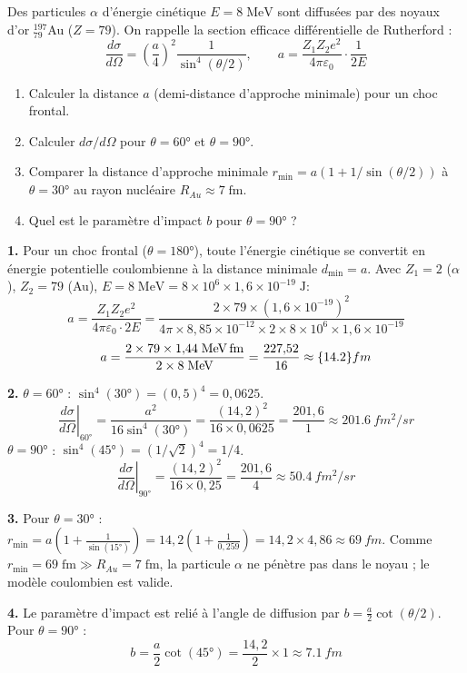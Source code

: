 \documentclass[12pt,a4paper]{article}
\begin{document}
\begin{boiteexercice}
Des particules $\alpha$ d'énergie cinétique $E=8\;\text{MeV}$ sont diffusées par des noyaux d'or ${}^{197}_{79}$Au ($Z=79$). On rappelle la section efficace différentielle de Rutherford :
\[
\frac{d\sigma}{d\Omega} = \left(\frac{a}{4}\right)^2 \frac{1}{\sin^4(\theta/2)}, \qquad a = \frac{Z_1 Z_2 e^2}{4\pi\varepsilon_0}\cdot\frac{1}{2E}
\]
\begin{enumerate}
  \item Calculer la distance $a$ (demi-distance d'approche minimale) pour un choc frontal.
  \item Calculer $d\sigma/d\Omega$ pour $\theta=60°$ et $\theta=90°$.
  \item Comparer la distance d'approche minimale $r_\text{min}=a(1+1/\sin(\theta/2))$ à $\theta=30°$ au rayon nucléaire $R_{Au}\approx 7\;\text{fm}$.
  \item Quel est le paramètre d'impact $b$ pour $\theta=90°$ ?
\end{enumerate}
\end{boiteexercice}

\begin{boitecorrige}
\textbf{1.} Pour un choc frontal ($\theta=180°$), toute l'énergie cinétique se convertit en énergie potentielle coulombienne à la distance minimale $d_\text{min}=a$. Avec $Z_1=2$ ($\alpha$), $Z_2=79$ (Au), $E=8\;\text{MeV}=8\times10^6\times1{,}6\times10^{-19}\;\text{J}$:
\[
a = \frac{Z_1 Z_2 e^2}{4\pi\varepsilon_0\cdot 2E} = \frac{2\times79\times(1{,}6\times10^{-19})^2}{4\pi\times8{,}85\times10^{-12}\times2\times8\times10^6\times1{,}6\times10^{-19}}
\]
\[
a = \frac{2\times79\times1{,}44\;\text{MeV\,fm}}{2\times8\;\text{MeV}} = \frac{227{,}52}{16} \approx \qty{14.2}{fm}
\]

\textbf{2.} $\theta=60°$ : $\sin^4(30°) = (0{,}5)^4 = 0{,}0625$.
\[
\left.\frac{d\sigma}{d\Omega}\right|_{60°} = \frac{a^2}{16\sin^4(30°)} = \frac{(14{,}2)^2}{16\times0{,}0625} = \frac{201{,}6}{1} \approx \qty{201.6}{fm^2/sr}
\]
$\theta=90°$ : $\sin^4(45°) = (1/\sqrt{2})^4 = 1/4$.
\[
\left.\frac{d\sigma}{d\Omega}\right|_{90°} = \frac{(14{,}2)^2}{16\times0{,}25} = \frac{201{,}6}{4} \approx \qty{50.4}{fm^2/sr}
\]

\textbf{3.} Pour $\theta=30°$ : $r_\text{min} = a\!\left(1+\frac{1}{\sin(15°)}\right) = 14{,}2\!\left(1+\frac{1}{0{,}259}\right) = 14{,}2\times4{,}86 \approx \qty{69}{fm}$.
Comme $r_\text{min}=69\;\text{fm} \gg R_{Au}=7\;\text{fm}$, la particule $\alpha$ ne pénètre pas dans le noyau ; le modèle coulombien est valide.

\textbf{4.} Le paramètre d'impact est relié à l'angle de diffusion par $b = \frac{a}{2}\cot(\theta/2)$.
Pour $\theta=90°$ :
\[
b = \frac{a}{2}\cot(45°) = \frac{14{,}2}{2}\times1 \approx \qty{7.1}{fm}
\]
\end{boitecorrige}
\end{document}
